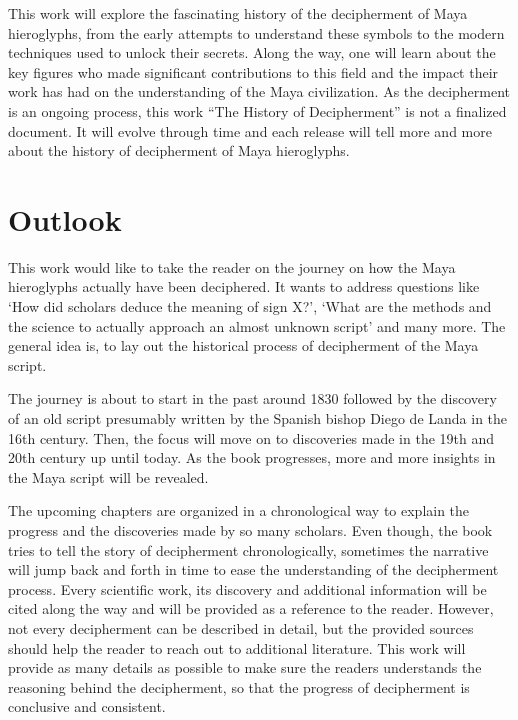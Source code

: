 \documentclass[../main.tex]{subfiles}
\begin{document}
This work will explore the fascinating history of the decipherment of Maya hieroglyphs, 
from the early attempts to understand these symbols to the modern techniques used to unlock 
their secrets. Along the way, one will learn about the key figures who made significant 
contributions to this field and the impact their work has had on the understanding of the 
Maya civilization.
As the decipherment is an ongoing process, this work ``The History of Decipherment'' is not a 
finalized document.
It will evolve through time and each release will tell more and more 
about the history of decipherment of Maya hieroglyphs.

\section{Outlook}
This work would like to take the reader on the journey on how the Maya hieroglyphs actually 
have been deciphered.
It wants to address questions like `How did scholars deduce the meaning of sign X?',
`What are the methods and the science to actually approach an almost unknown script' and many more.
The general idea is, to lay out the historical process of decipherment of the Maya script.

The journey is about to start in the past around 1830
followed by the discovery of an old script presumably written by the Spanish bishop Diego de Landa 
in the 16th century.
Then, the focus will move on to discoveries made in the 19th and 20th century up until today.
As the book progresses, more and more insights in the Maya script will be revealed.

The upcoming chapters are organized in a chronological way to explain the progress and the 
discoveries made by so many scholars.
Even though, the book tries to tell the story of decipherment chronologically, sometimes
the narrative will jump back and forth in time to ease the understanding of 
the decipherment process.
Every scientific work, its discovery and additional information will be cited along the way and 
will be provided as a reference to the reader.
However, not every decipherment can be described in detail, but the provided sources should help 
the reader to reach out to additional literature.
This work will provide as many details as possible to make sure the readers understands the 
reasoning behind the decipherment, so that the progress of decipherment is 
conclusive and consistent.
\end{document}
